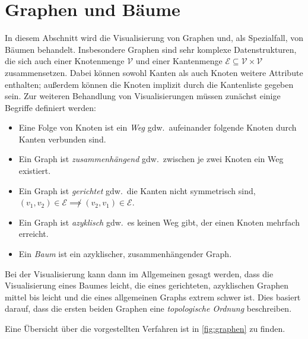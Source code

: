 	\section{Graphen und Bäume}
		\label{sec:visGraphen}

		In diesem Abschnitt wird die Visualisierung von Graphen und, als Spezialfall, von Bäumen behandelt. Insbesondere Graphen sind sehr komplexe Datenstrukturen, die sich auch einer Knotenmenge \(\mathcal{V}\) und einer Kantenmenge \( \mathcal{E} \subseteq \mathcal{V} \times \mathcal{V} \) zusammensetzen. Dabei können sowohl Kanten als auch Knoten weitere Attribute enthalten; außerdem können die Knoten implizit durch die Kantenliste gegeben sein. Zur weiteren Behandlung von Visualisierungen müssen zunächst einige Begriffe definiert werden:
		\begin{itemize}
			\item Eine Folge von Knoten ist ein \emph{Weg} gdw.~aufeinander folgende Knoten durch Kanten verbunden sind.
			\item Ein Graph ist \emph{zusammenhängend} gdw.~zwischen je zwei Knoten ein Weg existiert.
			\item Ein Graph ist \emph{gerichtet} gdw.~die Kanten nicht symmetrisch sind, \dh \( (v_1, v_2) \in \mathcal{E} \not\implies (v_2, v_1) \in \mathcal{E} \).
			\item Ein Graph ist \emph{azyklisch} gdw.~es keinen Weg gibt, der einen Knoten mehrfach erreicht.
			\item Ein \emph{Baum} ist ein azyklischer, zusammenhängender Graph.
		\end{itemize}
		Bei der Visualisierung kann dann im Allgemeinen gesagt werden, dass die Visualisierung eines Baumes leicht, die eines gerichteten, azyklischen Graphen mittel bis leicht und die eines allgemeinen Graphs extrem schwer ist. Dies basiert darauf, dass die ersten beiden Graphen eine \emph{topologische Ordnung} beschreiben.

		Eine Übersicht über die vorgestellten Verfahren ist in \autoref{fig:graphen} zu finden.


